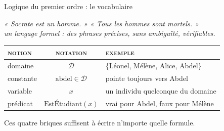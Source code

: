 \documentclass[aspectratio=169,10pt]{beamer}
\begin{document}
\begin{frame}{Logique du premier ordre : le vocabulaire}
  \begin{center}
    \small\itshape\color{ash}
    « Socrate est un homme. » \quad « Tous les hommes sont mortels. »\\
    \normalfont\small\normalcolor
    un langage formel : des phrases précises, sans ambiguïté, vérifiables.
  \end{center}

  \vspace{0.7em}
  \begin{center}
  \small
  \renewcommand{\arraystretch}{1.6}
  \begin{tabular}{@{} l c >{\raggedright\arraybackslash}m{5.6cm} @{}}
    \toprule
    {\color{ash}\scshape\footnotesize notion} &
    {\color{ash}\scshape\footnotesize notation} &
    {\color{ash}\scshape\footnotesize exemple} \\
    \midrule
    domaine & $\mathcal{D}$ & $\{$Léonel, Mélène, Alice, Abdel$\}$ \\
    constante & $\text{abdel} \in \mathcal{D}$ & pointe toujours vers Abdel \\
    variable & $x$ & un individu quelconque du domaine \\
    prédicat & $\text{EstÉtudiant}(x)$ & vrai pour Abdel, faux pour Mélène \\
    \bottomrule
  \end{tabular}
  \end{center}

  \vspace{0.5em}
  \begin{center}
    \small Ces quatre briques suffisent à écrire n'importe quelle
    \alert{formule}.
  \end{center}
\end{frame}
\end{document}
